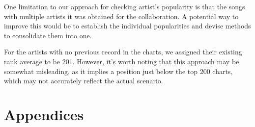 \documentclass{article}
\begin{document}
One limitation to our approach for checking artist's popularity is that the songs with multiple artists it was obtained for the collaboration. A potential way to improve this would be to establish the individual popularities and devise methods to consolidate them into one. 

For the artists with no previous record in the charts, we assigned their existing rank average to be 201. However, it's worth noting that this approach may be somewhat misleading, as it implies a position just below the top 200 charts, which may not accurately reflect the actual scenario. 








\section*{Appendices}
\end{document}
